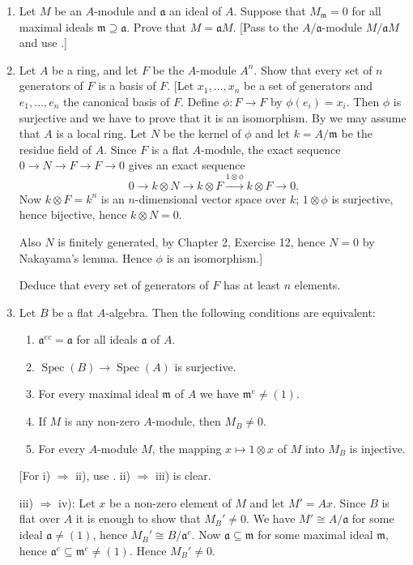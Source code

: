 \begin{enumerate}
\item Let $M$ be an $A$-module and $\mathfrak a$ an ideal of $A$. Suppose that $M_{\mathfrak m}=0$ for all maximal ideals $\mathfrak m\supseteq\mathfrak a$. Prove that $M=\mathfrak aM$. [Pass to the $A/\mathfrak a$-module $M/\mathfrak aM$ and use .]

\item Let $A$ be a ring, and let $F$ be the $A$-module $A^n$. Show that every set of $n$ generators of $F$ is a basis of $F$. [Let $x_1,\ldots,x_n$ be a set of generators and $e_1,\ldots,e_n$ the canonical basis of $F$. Define $\phi:F\longrightarrow F$ by $\phi(e_i)=x_i$. Then $\phi$ is surjective and we have to prove that it is an isomorphism. By  we may assume that $A$ is a local ring. Let $N$ be the kernel of $\phi$ and let $k=A/\mathfrak m$ be the residue field of $A$. Since $F$ is a flat $A$-module, the exact sequence $0\longrightarrow N\longrightarrow F\longrightarrow F\longrightarrow0$ gives an exact sequence
\[
 0\longrightarrow k\otimes N\longrightarrow k\otimes F\xrightarrow{1\otimes\phi}k\otimes F\longrightarrow0.
\]
Now $k\otimes F=k^n$ is an $n$-dimensional vector space over $k$; $1\otimes\phi$ is surjective, hence bijective, hence $k\otimes N=0$.

Also $N$ is finitely generated, by Chapter 2, Exercise 12, hence $N=0$ by Nakayama's lemma. Hence $\phi$ is an isomorphism.]

Deduce that every set of generators of $F$ has at least $n$ elements.

\item Let $B$ be a flat $A$-algebra. Then the following conditions are equivalent:
\begin{enumerate}
\renewcommand{\labelenumii}{\roman{enumii})}
\item $\mathfrak a^{ec}=\mathfrak a$ for all ideals $\mathfrak a$ of $A$.
\item $\operatorname{Spec}(B)\longrightarrow\operatorname{Spec}(A)$ is surjective.
\item For every maximal ideal $\mathfrak m$ of $A$ we have $\mathfrak m^e\neq(1)$.
\item If $M$ is any non-zero $A$-module, then $M_B\neq0$.
\item For every $A$-module $M$, the mapping $x\mapsto1\otimes x$ of $M$ into $M_B$ is injective.
\end{enumerate}
[For i) $\Rightarrow$ ii), use . ii) $\Rightarrow$ iii) is clear.

iii) $\Rightarrow$ iv): Let $x$ be a non-zero element of $M$ and let $M'=Ax$. Since $B$ is flat over $A$ it is enough to show that $M_B'\neq0$. We have $M'\cong A/\mathfrak a$ for some ideal $\mathfrak a\neq(1)$, hence $M_B'\cong B/\mathfrak a^e$. Now $\mathfrak a\subseteq\mathfrak m$ for some maximal ideal $\mathfrak m$, hence $\mathfrak a^e\subseteq\mathfrak m^e\neq(1)$. Hence $M_B'\neq0$.


\end{enumerate}
